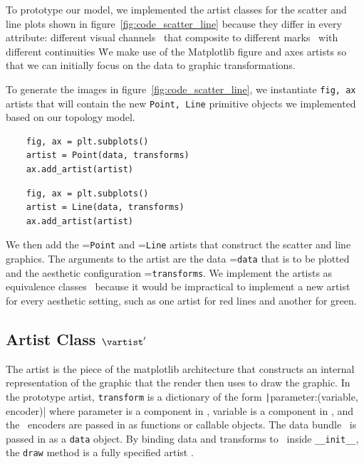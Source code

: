 \documentclass[../main.tex]{subfiles}
\begin{document}
To prototype our model, we implemented the artist classes for the scatter and line plots shown in figure~\ref{fig:code_scatter_line} because they differ in every attribute: different visual channels \vchannel\ that composite to different marks \vmark\ with different continuities \vindex\.  We make use of the Matplotlib figure and axes artists \cite{hunterArchitectureOpenSource,hunterMatplotlib2DGraphics2007} so that we can initially focus on the data to graphic transformations. 

To generate the images in figure~\ref{fig:code_scatter_line}, we instantiate \texttt{fig, ax} artists that will contain the new \texttt{Point, Line} primitive objects we implemented based on our topology model. 

\begin{multicols*}{2}
\begin{verbatim}
    fig, ax = plt.subplots()
    artist = Point(data, transforms)
    ax.add_artist(artist)
\end{verbatim}
\columnbreak
\begin{verbatim}
    fig, ax = plt.subplots()
    artist = Line(data, transforms)
    ax.add_artist(artist)
\end{verbatim}
\end{multicols*}

We then add the \vartisteq=\texttt{Point} and  \vartisteq=\texttt{Line} artists that construct the scatter and line graphics. The arguments to the artist are the data \dtotal=\texttt{data} that is to be plotted and the aesthetic configuration \vchannel=\texttt{transforms}. We implement the artists as equivalence classes \vartisteq\ because it would be impractical to implement a new artist for every aesthetic setting, such as one artist for red lines and another for green.
 
\subsection{Artist Class $\vartist^{\prime}$}
\label{sec:code_artist}
The artist is the piece of the matplotlib architecture that constructs an internal representation of the graphic that the render then uses to draw the graphic. In the prototype artist, \texttt{transform} is a dictionary of the form \texttt|{parameter:(variable, encoder)}| where parameter is a component in \vfiber, variable is a component in \dfiber,  and the \vchannel\ encoders are passed in as functions or callable objects. The data bundle \dtotal\ is passed in as a \texttt{data} object. By binding data and transforms to \vartisteq\ inside \texttt{__init__}, the \texttt{draw} method is a fully specified artist \vartist.
\end{document}
